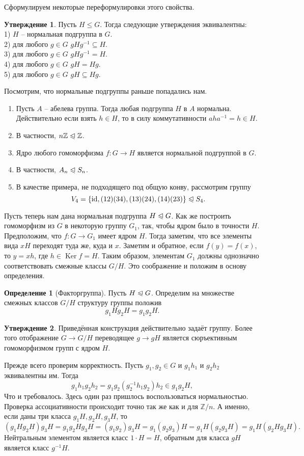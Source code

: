\documentclass[10pt,a4paper,oneside]{book}
\theoremstyle{definition}
\newtheorem*{defn}{\color{yellow!30!red} Определение}
\newtheorem{utvr}{\color{blue!50!black}Утверждение}
\renewcommand{\leq}{\leqslant}
\newcommand{\mb}[1]{\mathbb{#1}}
\newcommand{\id}{\operatorname{id}}
\DeclareMathOperator{\Ker}{Ker}
\def\exm{\noindent {\bf Примеры:}}
\def\dfn{\begin{defn}}
\def\edfn{\end{defn}}
\def\enm{\begin{enumerate}}
\def\eenm{\end{enumerate}}
\def\utv{\begin{utvr}}
\def\eutv{\end{utvr}}
\def\nrml{\trianglelefteqslant}
\begin{document}
Сформулируем некоторые переформулировки этого свойства.

\utv Пусть $H \leq G$. Тогда следующие утверждения эквивалентны:\\
1) $H$ -- нормальная подгруппа в $G$.\\
2) для любого $g\in G$ $gHg^{-1}\subseteq H$.\\
3) для любого $g\in G$ $gHg^{-1}= H$.\\
4) для любого $g\in G$ $gH=Hg$.\\
5) для любого $g\in G$ $gH\subseteq Hg$.
\eutv

Посмотрим, что нормальные подгруппы раньше попадались нам.\\


\exm \enm
\item Пусть $A$ -- абелева группа. Тогда любая подгруппа $H$ в $A$ нормальна. Действительно если взять $h\in H$, то в силу коммутативности $aha^{-1} =h \in H$.
\item В частности, $n \mb Z \nrml \mb Z$. 
\item Ядро любого гомоморфизма $f\colon G \to H$ является нормальной подгруппой в $G$.
\item В частности, $A_n \nrml S_n$.
\item В качестве примера, не подходящего под общую конву, рассмотрим группу $$V_4=\{\id, (12)(34),(13)(24),(14)(23)\} \nrml S_4.$$ 
\eenm

Пусть теперь нам дана нормальная подгруппа $H\nrml G$. Как же построить гомоморфизм из $G$ в некоторую группу $G_1$, так, чтобы ядром было в точности $H$. Предположим, что $f\colon G \to G_1$ имеет ядром $H$. Тогда заметим, что все элементы вида $xH$ переходят туда же, куда и $x$. Заметим и обратное, если $f(y)=f(x)$, то $y=xh$, где $h\in \Ker f =H$. Таким образом, элементам $G_1$ должны однозначно соответствовать смежные классы $G/H$. Это соображение и положим в основу определения.

\dfn[Факторгруппа] Пусть $H\nrml G$. Определим на множестве смежных классов $G/H$ структуру группы положив 
$$g_1 H g_2 H= g_1g_2 H.$$
\edfn

\utv Приведённая конструкция действительно задаёт группу. Более того отображение $G \to G/H$ переводящее $g \to gH$ является сюръективным гомоморфизмом групп с ядром $H$. 
\eutv 
\proof Прежде всего проверим корректность. Пусть $g_1,g_2\in G$ и $g_1h_1$ и $g_2h_2$ эквивалентны им. Тогда $$g_1h_1g_2h_2=g_1g_2(g_2^{-1}h_1 g_2) h_2 \in g_1g_2H,$$
Что и требовалось. Здесь один раз пришлось воспользоваться нормальностью. Проверка ассоциативности происходит точно так же как и для $\mb Z/n$. А именно, если даны три класса $g_1H, g_2H, g_3H$, то
$$(g_1H g_2H) g_3H=g_1g_2H g_3H=(g_1 g_2) g_3H=g_1 (g_2 g_3)H=g_1H (g_2 g_3H)=g_1H (g_2H g_3H).$$
Нейтральным элементом является класс $1\cdot H=H$, обратным для класса $gH$ является класс $g^{-1}H$.
\endproof
\end{document}
